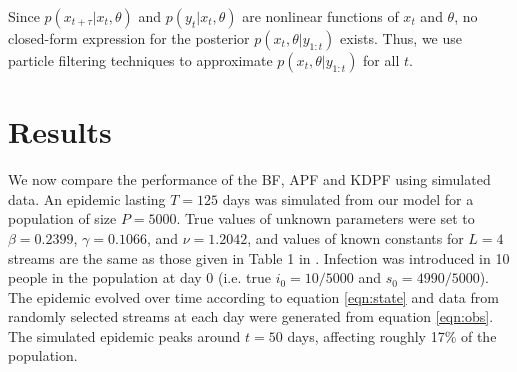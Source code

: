 \documentclass[useAMS,referee,usenatbib]{biom}
\begin{document}
Since $p(x_{t+\tau}|x_t,\theta)$ and $p(y_t|x_t,\theta)$ are nonlinear functions of $x_t$ and $\theta$, no closed-form expression for the posterior $p(x_t,\theta|y_{1:t})$ exists.  Thus, we use particle filtering techniques to approximate $p(x_t,\theta|y_{1:t})$ for all $t$.

\section{Results \label{sec:results}}

We now compare the performance of the BF, APF and KDPF using simulated data.  An epidemic lasting $T = 125$ days was simulated from our model for a population of size $P = 5000$.  True values of unknown parameters were set to $\beta = 0.2399$, $\gamma = 0.1066$, and $\nu = 1.2042$, and values of known constants for $L = 4$ streams are the same as those given in Table 1 in \citet{skvortsov2012monitoring}.  Infection was introduced in 10 people in the population at day 0 (i.e. true $i_0 = 10/5000$ and $s_0 = 4990/5000$).  The epidemic evolved over time according to equation \eqref{eqn:state} and data from randomly selected streams at each day were generated from equation \eqref{eqn:obs}.  The simulated epidemic peaks around $t = 50$ days, affecting roughly 17\% of the population.

%
\end{document}
